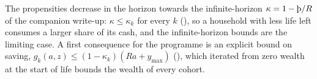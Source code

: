 The propensities decrease in the horizon towards the infinite-horizon $\kappa=1-\Thorn/R$ of the
companion write-up: $\kappa\le\kappa_k$ for every $k$ (), so a
household with less life left consumes a larger share of its cash, and the infinite-horizon bounds
are the limiting case. A first consequence for the programme is an explicit bound on saving,
$g_k(a,z)\le(1-\kappa_k)(Ra+y_{\max})$ (), which iterated from zero wealth
at the start of life bounds the wealth of every cohort.
